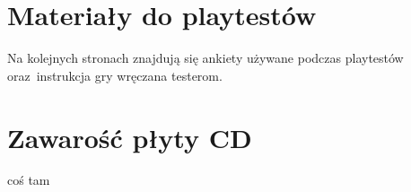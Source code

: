 \documentclass[licencjacka]{pracamgr}
\begin{document}
  \chapter{Materiały do playtestów}
  Na kolejnych stronach znajdują się ankiety używane podczas playtestów
  oraz~instrukcja gry wręczana testerom.

    
    
    

  \chapter{Zawarość płyty CD}


\begin{thebibliography}{99}

  \item{coś tam}

\end{thebibliography}
\end{document}
